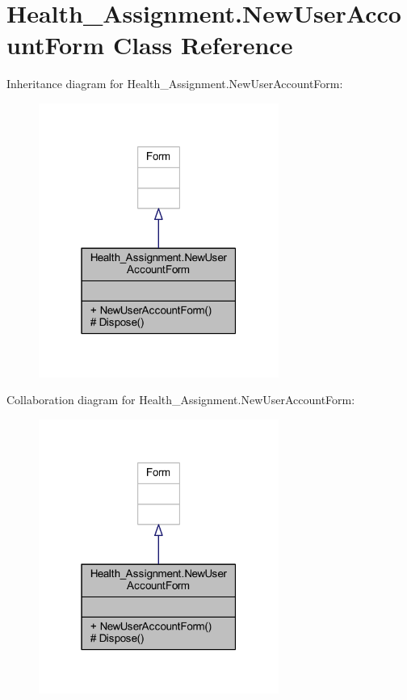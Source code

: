 \hypertarget{class_health___assignment_1_1_new_user_account_form}{}\section{Health\+\_\+\+Assignment.\+New\+User\+Account\+Form Class Reference}
\label{class_health___assignment_1_1_new_user_account_form}


Inheritance diagram for Health\+\_\+\+Assignment.\+New\+User\+Account\+Form\+:\nopagebreak
\begin{figure}[H]
\begin{center}
\leavevmode
\includegraphics[width=223pt]{class_health___assignment_1_1_new_user_account_form__inherit__graph}
\end{center}
\end{figure}


Collaboration diagram for Health\+\_\+\+Assignment.\+New\+User\+Account\+Form\+:\nopagebreak
\begin{figure}[H]
\begin{center}
\leavevmode
\includegraphics[width=223pt]{class_health___assignment_1_1_new_user_account_form__coll__graph}
\end{center}
\end{figure}
